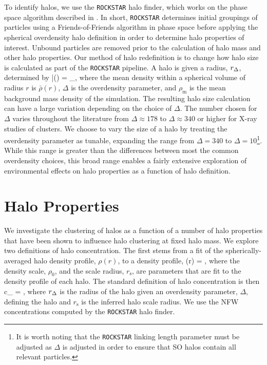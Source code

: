 \documentclass[usenatbib,usegraphicx,letterpaper]{mn2e}
\begin{document}
To identify halos, we use the {\tt ROCKSTAR} halo finder, which works on the phase space algorithm described in
\citet*{behroozi13}. In short, {\tt ROCKSTAR} determines initial groupings of particles using a Friends-of-Friends algorithm 
in phase space before applying the spherical overdensity halo definition in order to determine halo properties of
interest. Unbound particles are removed prior to the calculation of halo mass and other halo properties. Our
method of halo redefinition is to change how halo size is calculated as part of the {\tt ROCKSTAR} pipeline. A halo is
given a radius, $r_{\Delta}$, determined by
\beq
	\bar{\rho}(\Rdel) = \Delta \rho_{}, 
\eeq
where the mean density within a spherical volume of radius $r$ is $\bar{\rho}(r)$, $\Delta$ is the overdensity
parameter, and $\rho_{\mathrm{m}}$ is the mean background mass density of the simulation. The resulting
halo size calculation can have a large variation depending on the choice of $\Delta$. The number chosen for
$\Delta$ varies throughout the literature from $\Delta \approx 178$ to $\Delta \approx 340$ or higher for X-ray studies of 
clusters. We choose to vary the size of a halo by treating the overdensity parameter as tunable, expanding the range from 
$\Delta = 340$ to $\Delta = 10$\footnote{It is worth noting that the {\tt ROCKSTAR} linking length parameter must be adjusted 
as $\Delta$ is adjusted in order to ensure that SO halos contain all relevant particles.}. While this range is greater than the 
differences between most the common overdensity choices, this broad range enables a fairly extensive exploration of 
environmental effects on halo properties as a function of halo definition.


\section{Halo Properties}
\label{section:haloprops}

We investigate the clustering of halos as a function of a number of halo properties 
that have been shown to influence halo clustering at fixed halo mass. We explore 
two definitions of halo concentration. The first stems from a fit of the spherically-averaged 
halo density profile, $\rho(r)$, to a \citet[][; hereafter, NFW]{nfw97} density profile, 
%
\beq
\rho(r) = ,
\eeq
%
where the density scale, $\rho_0$, and the scale radius, $r_{\mathrm{s}}$, are parameters 
that are fit to the density profile of each halo. The standard definition of halo concentration is then 
\beq
c_{} = ,
\eeq
where $r_{\Delta}$ is the radius of the halo given an overdensity parameter, $\Delta$, defining the halo 
and $r_{\mathrm{s}}$ is the inferred halo scale radius. We use the NFW concentrations computed by the 
{\tt ROCKSTAR} halo finder.  
\end{document}
